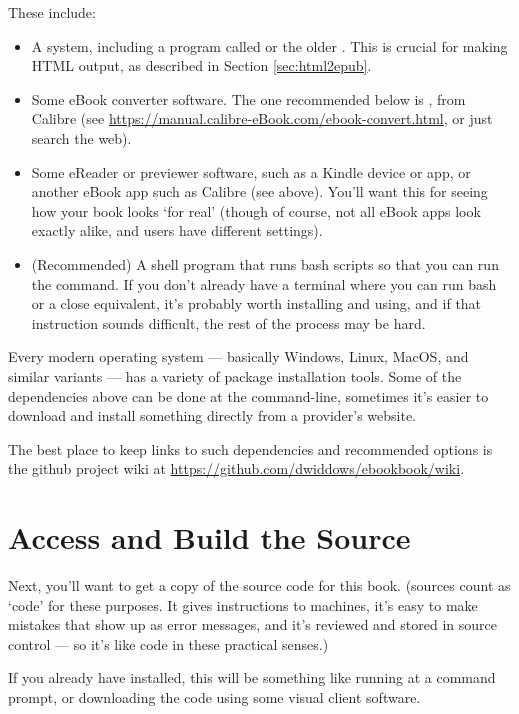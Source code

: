 These include:

\begin{itemize}
\item A \latex system, including a program called  or the older .
  This is crucial for making HTML output, as described in Section
  \ref{sec:html2epub}.
\item Some eBook converter software. The one recommended below is
  , from Calibre (see
  {\small \url{https://manual.calibre-eBook.com/ebook-convert.html}}, or just
  search the web).
\item Some eReader or previewer software, such as a Kindle device or
  app, or another eBook app such as Calibre (see above). You'll want
  this for seeing how your book looks `for real' (though of course,
  not all eBook apps look exactly alike, and users have different settings).
\item (Recommended) A shell program that runs bash scripts so that you
  can run the  command. If you don't already have a
  terminal where you can run bash or a close equivalent, it's probably
  worth installing and using, and if that instruction sounds
  difficult, the rest of the process may be hard.
\end{itemize}

Every modern operating system --- basically Windows, Linux, MacOS, and
similar variants --- has a variety of package installation tools.
Some of the dependencies above can be done at the command-line, sometimes it's
easier to download and install something directly from a provider's
website.

The best place to keep links to such dependencies and recommended options is the 
github project wiki at {\small \url{https://github.com/dwiddows/ebookbook/wiki}}.

\section{Access and Build the \latex Source}

Next, you'll want to get a copy of the source code for this
book. (\latex sources count as
`code' for these purposes. It gives instructions to machines, it's easy to make mistakes
that show up as error messages, and it's reviewed and stored in source
control --- so it's like code in these practical senses.)

If you already have  installed, this will be something
like running  at a command prompt, or
downloading the code using some visual client software. 

